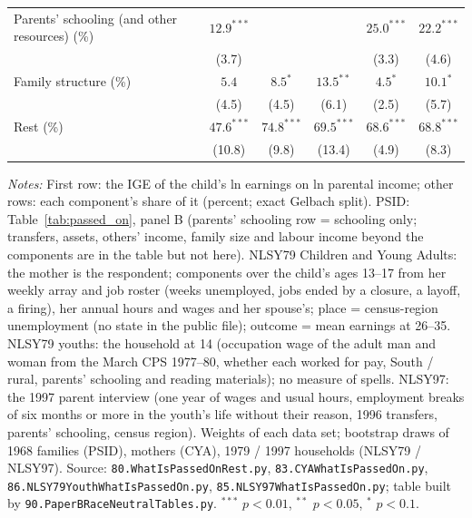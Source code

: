 \begin{table}[!htbp]
{{\begin{tabular}{lccccc}
Parents' schooling (and other resources) (\%) & $12.9^{***}$ &  &  & $25.0^{***}$ & $22.2^{***}$ \\
 & (3.7) &  &  & (3.3) & (4.6) \\
Family structure (\%) & $5.4$ & $8.5^{*}$ & $13.5^{**}$ & $4.5^{*}$ & $10.1^{*}$ \\
 & (4.5) & (4.5) & (6.1) & (2.5) & (5.7) \\
Rest (\%) & $47.6^{***}$ & $74.8^{***}$ & $69.5^{***}$ & $68.6^{***}$ & $68.8^{***}$ \\
 & (10.8) & (9.8) & (13.4) & (4.9) & (8.3) \\
\bottomrule
\end{tabular}}}
\par\smallskip
\begin{minipage}{\textwidth}\footnotesize \textit{Notes:} First row: the IGE of the child's ln earnings on ln parental income; other rows: each component's share of it (percent; exact Gelbach split). PSID: Table~\ref{tab:passed_on}, panel B (parents' schooling row = schooling only; transfers, assets, others' income, family size and labour income beyond the components are in the table but not here). NLSY79 Children and Young Adults: the mother is the respondent; components over the child's ages 13--17 from her weekly array and job roster (weeks unemployed, jobs ended by a closure, a layoff, a firing), her annual hours and wages and her spouse's; place = census-region unemployment (no state in the public file); outcome = mean earnings at 26--35. NLSY79 youths: the household at 14 (occupation wage of the adult man and woman from the March CPS 1977--80, whether each worked for pay, South / rural, parents' schooling and reading materials); no measure of spells. NLSY97: the 1997 parent interview (one year of wages and usual hours, employment breaks of six months or more in the youth's life without their reason, 1996 transfers, parents' schooling, census region). Weights of each data set; bootstrap draws of 1968 families (PSID), mothers (CYA), 1979 / 1997 households (NLSY79 / NLSY97). Source: \texttt{80.WhatIsPassedOnRest.py}, \texttt{83.CYAWhatIsPassedOn.py}, \texttt{86.NLSY79YouthWhatIsPassedOn.py}, \texttt{85.NLSY97WhatIsPassedOn.py}; table built by \texttt{90.PaperBRaceNeutralTables.py}. $^{***}$ $p<0.01$, $^{**}$ $p<0.05$, $^{*}$ $p<0.1$.\end{minipage}
\end{table}
